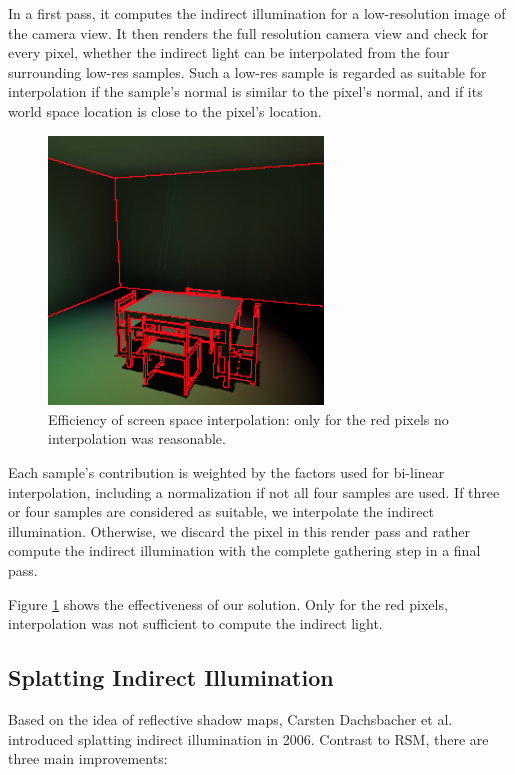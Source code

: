 In a first pass, it computes the indirect illumination for a low-resolution image of the camera view. It then renders the full resolution camera view and check for every pixel, whether the indirect light can be interpolated from the four surrounding low-res samples. Such a low-res sample is regarded as suitable for interpolation if the sample's normal is similar to the pixel's normal, and if its world space location is close to the pixel's location. 

\begin{figure}
\sidecaption
	\includegraphics[width=0.65\textwidth]{graphics/ir/ir-2-4}
	\caption{Efficiency of screen space interpolation: only for the red pixels no interpolation was reasonable.}
	\label{f:rsm-4}
\end{figure} 

Each sample's contribution is weighted by the factors used for bi-linear interpolation, including a normalization if not all four samples are used. If three or four samples are considered as suitable, we interpolate the indirect illumination. Otherwise, we discard the pixel in this render pass and rather compute the indirect illumination with the complete gathering step in a final pass.

Figure \ref{f:rsm-4} shows the effectiveness of our solution. Only for the red pixels, interpolation was not sufficient to compute the indirect light. 




\subsection{Splatting Indirect Illumination}
Based on the idea of reflective shadow maps, Carsten Dachsbacher et al. introduced splatting indirect illumination\cite{a:SplattingIndirectIllumination} in 2006. Contrast to RSM, there are three main improvements:

